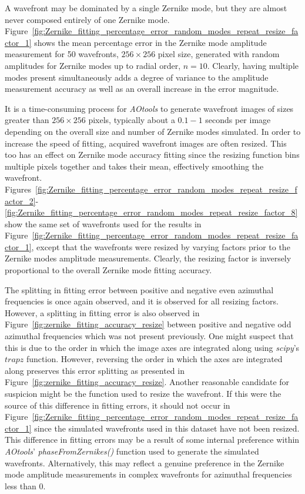 A wavefront may be dominated by a single Zernike mode, but they are almost 
never composed entirely of one Zernike mode. 
Figure~\ref{fig:Zernike_fitting_percentage_error_random_modes_repeat_resize_factor_1} shows the mean percentage error in the Zernike mode amplitude 
measurement for 50 wavefronts, $256\times256$ pixel size, generated with 
random amplitudes for Zernike modes up to radial order, $n = 10$. Clearly, 
having multiple modes present simultaneously adds a degree of variance to the 
amplitude measurement accuracy as well as an overall increase in the error 
magnitude.

It is a time-consuming process for \textit{AOtools} to generate wavefront 
images of sizes greater than $256\times256$ pixels, typically about a $0.1-1$ 
seconds per image depending on the overall size and number of Zernike modes 
simulated. In order to increase the speed of fitting, acquired wavefront 
images are often resized. This too has an effect on Zernike mode accuracy 
fitting since the resizing function bins multiple pixels together and takes 
their mean, effectively smoothing the wavefront. 
Figures~\ref{fig:Zernike_fitting_percentage_error_random_modes_repeat_resize_factor_2}-\ref{fig:Zernike_fitting_percentage_error_random_modes_repeat_resize_factor_8} show the same set of wavefronts used for the results in 
Figure~\ref{fig:Zernike_fitting_percentage_error_random_modes_repeat_resize_factor_1}, except that the wavefronts were resized by varying factors prior to 
the Zernike modes amplitude measurements. Clearly, the resizing factor is 
inversely proportional to the overall Zernike mode fitting accuracy.

The splitting in fitting error between positive and negative even azimuthal 
frequencies is 
once again observed, and it is observed for all resizing factors. However, a 
splitting in fitting error is also observed in 
Figure~\ref{fig:zernike_fitting_accuracy_resize} between positive and 
negative odd azimuthal frequencies which was not present previously. One 
might suspect that this is due to the order in which the image axes are 
integrated along using \textit{scipy}'s $trapz$ function. However, reversing 
the order in which the axes are integrated along preserves this error 
splitting as presented in Figure~\ref{fig:zernike_fitting_accuracy_resize}. 
Another reasonable candidate for suspicion might be the function used to 
resize the wavefront. If this were the source of this difference in fitting 
errors, it should not occur in 
Figure~\ref{fig:Zernike_fitting_percentage_error_random_modes_repeat_resize_factor_1} since the simulated wavefronts used in this dataset have not been 
resized. This difference in fitting errors may be a result of some internal 
preference within \textit{AOtools}' \textit{phaseFromZernikes()} function 
used to generate the simulated wavefronts. Alternatively, this may reflect a 
genuine preference in the Zernike mode amplitude measurements in complex 
wavefronts for azimuthal frequencies less than 0.

